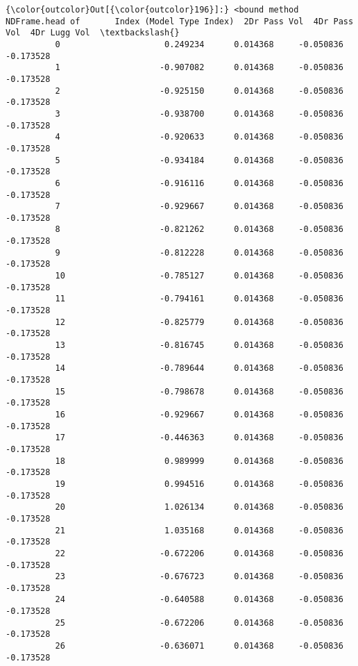 \documentclass[11pt]{article}
\begin{document}
            \begin{Verbatim}[commandchars=\\\{\}]
{\color{outcolor}Out[{\color{outcolor}196}]:} <bound method NDFrame.head of       Index (Model Type Index)  2Dr Pass Vol  4Dr Pass Vol  4Dr Lugg Vol  \textbackslash{}
          0                     0.249234      0.014368     -0.050836     -0.173528   
          1                    -0.907082      0.014368     -0.050836     -0.173528   
          2                    -0.925150      0.014368     -0.050836     -0.173528   
          3                    -0.938700      0.014368     -0.050836     -0.173528   
          4                    -0.920633      0.014368     -0.050836     -0.173528   
          5                    -0.934184      0.014368     -0.050836     -0.173528   
          6                    -0.916116      0.014368     -0.050836     -0.173528   
          7                    -0.929667      0.014368     -0.050836     -0.173528   
          8                    -0.821262      0.014368     -0.050836     -0.173528   
          9                    -0.812228      0.014368     -0.050836     -0.173528   
          10                   -0.785127      0.014368     -0.050836     -0.173528   
          11                   -0.794161      0.014368     -0.050836     -0.173528   
          12                   -0.825779      0.014368     -0.050836     -0.173528   
          13                   -0.816745      0.014368     -0.050836     -0.173528   
          14                   -0.789644      0.014368     -0.050836     -0.173528   
          15                   -0.798678      0.014368     -0.050836     -0.173528   
          16                   -0.929667      0.014368     -0.050836     -0.173528   
          17                   -0.446363      0.014368     -0.050836     -0.173528   
          18                    0.989999      0.014368     -0.050836     -0.173528   
          19                    0.994516      0.014368     -0.050836     -0.173528   
          20                    1.026134      0.014368     -0.050836     -0.173528   
          21                    1.035168      0.014368     -0.050836     -0.173528   
          22                   -0.672206      0.014368     -0.050836     -0.173528   
          23                   -0.676723      0.014368     -0.050836     -0.173528   
          24                   -0.640588      0.014368     -0.050836     -0.173528   
          25                   -0.672206      0.014368     -0.050836     -0.173528   
          26                   -0.636071      0.014368     -0.050836     -0.173528   

\end{Verbatim}
\end{document}
